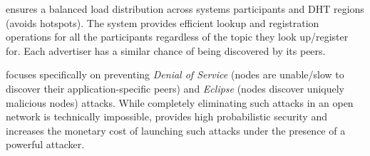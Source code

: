  \sysname ensures a balanced load distribution across systems participants and DHT regions (\ie avoids hotspots). The system provides efficient lookup and registration operations for all the participants regardless of the topic they look up/register for. Each advertiser has a similar chance of being discovered by its peers. 

 \sysname focuses specifically on preventing \emph{Denial of Service} (nodes are unable/slow to discover their application-specific peers) and \emph{Eclipse} (nodes discover uniquely malicious nodes) attacks. While completely eliminating such attacks in an open network is technically impossible, \sysname provides high probabilistic security and increases the monetary cost of launching such attacks under the presence of a powerful attacker.
